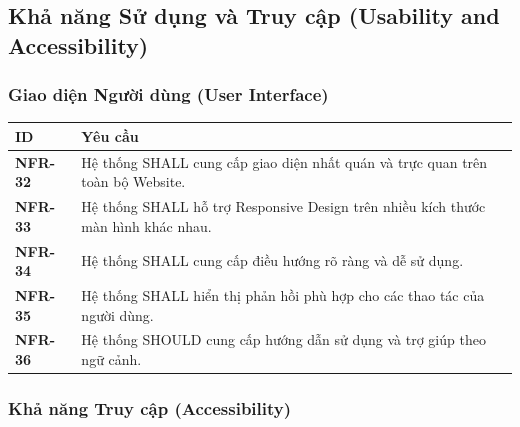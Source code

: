 \documentclass[12pt, a4paper]{article}
\begin{document}
\subsection{Khả năng Sử dụng và Truy cập (Usability and Accessibility)}

\subsubsection{Giao diện Người dùng (User Interface)}

\begin{table}[H]
    \centering
    \renewcommand{\arraystretch}{1.3}

    \begin{tabularx}{\textwidth}{|l|X|}
        \hline
        \rowcolor{gray!10}
        \textbf{ID}     & \textbf{Yêu cầu}                                                                  \\
        \hline
        \textbf{NFR-32} & Hệ thống SHALL cung cấp giao diện nhất quán và trực quan trên toàn bộ Website.    \\
        \hline
        \textbf{NFR-33} & Hệ thống SHALL hỗ trợ Responsive Design trên nhiều kích thước màn hình khác nhau. \\
        \hline
        \textbf{NFR-34} & Hệ thống SHALL cung cấp điều hướng rõ ràng và dễ sử dụng.                         \\
        \hline
        \textbf{NFR-35} & Hệ thống SHALL hiển thị phản hồi phù hợp cho các thao tác của người dùng.         \\
        \hline
        \textbf{NFR-36} & Hệ thống SHOULD cung cấp hướng dẫn sử dụng và trợ giúp theo ngữ cảnh.             \\
        \hline
    \end{tabularx}

\end{table}

\subsubsection{Khả năng Truy cập (Accessibility)}
\end{document}
